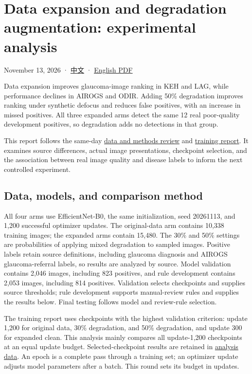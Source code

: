 \documentclass[
  10pt,
]{article}
\author{}
\date{}
\begin{document}
\section{Data expansion and degradation augmentation: experimental
analysis}\label{data-expansion-and-degradation-augmentation-experimental-analysis}

November 13, 2026 · \href{experimental-analysis.zh.md}{中文} ·
\href{experimental-analysis.en.pdf}{English PDF}

Data expansion improves glaucoma-image ranking in KEH and LAG, while
performance declines in AIROGS and ODIR. Adding 50\% degradation
improves ranking under synthetic defocus and reduces false positives,
with an increase in missed positives. All three expanded arms detect the
same 12 real poor-quality development positives, so degradation adds no
detections in that group.

This report follows the same-day
\href{../data-review/data-and-degradation-review.en.md}{data and methods
review} and \href{../training-results/training-results.en.md}{training
report}. It examines source differences, actual image presentations,
checkpoint selection, and the association between real image quality and
disease labels to inform the next controlled experiment.

\subsection{Data, models, and comparison
method}\label{data-models-and-comparison-method}

All four arms use EfficientNet-B0, the same initialization, seed
20261113, and 1,200 successful optimizer updates. The original-data arm
contains 10,338 training images; the expanded arms contain 15,480. The
30\% and 50\% settings are probabilities of applying mixed degradation
to sampled images. Positive labels retain source definitions, including
glaucoma diagnosis and AIROGS glaucoma-referral labels, so results are
analyzed by source. Model validation contains 2,046 images, including
823 positives, and rule development contains 2,053 images, including 814
positives. Validation selects checkpoints and supplies source
thresholds; rule development supports manual-review rules and supplies
the results below. Final testing follows model and review-rule
selection.

The training report uses checkpoints with the highest validation
criterion: update 1,200 for original data, 30\% degradation, and 50\%
degradation, and update 300 for expanded clean. This analysis mainly
compares all update-1,200 checkpoints at an equal update budget.
Selected-checkpoint results are retained in
\href{analysis.json}{analysis data}. An epoch is a complete pass through
a training set; an optimizer update adjusts model parameters after a
batch. This round sets its budget in updates.
\end{document}
